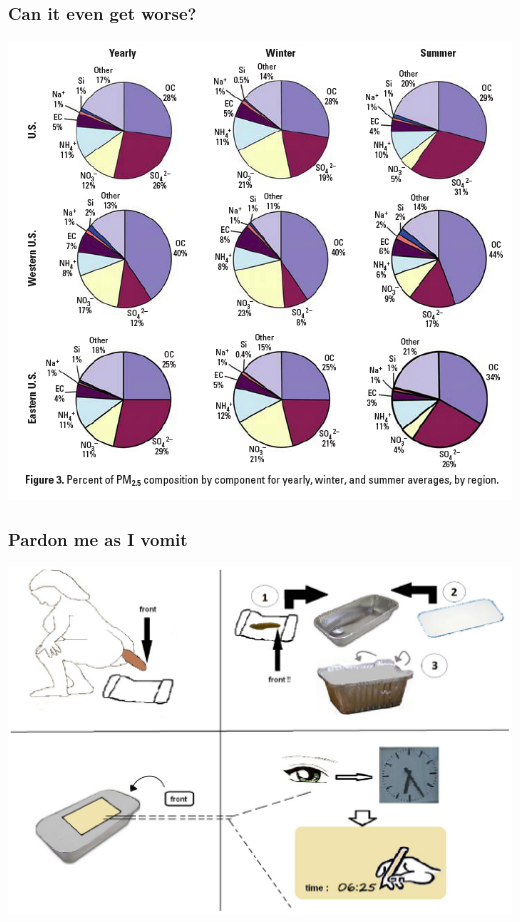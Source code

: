 \documentclass{beamer}
\begin{document}
\begin{frame}
  \frametitle{Can it even get worse?}
  \includegraphics[height = 0.8\textheight, keepaspectratio = true]{figure/bell_fig3}
\end{frame}

\begin{frame}
  \frametitle{Pardon me as I vomit}
  \includegraphics[width = \textwidth, keepaspectratio = true]{figure/poop}
\end{frame}
\end{document}

